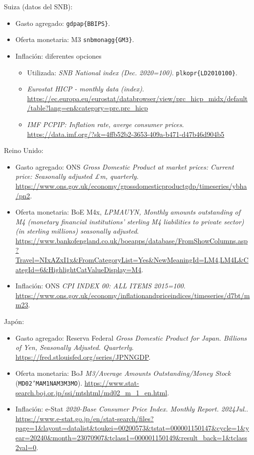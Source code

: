 Suiza (datos del SNB):
\begin{itemize}
  \item Gasto agregado: \texttt{gdpap\{BBIPS\}}.
  \item Oferta monetaria: M3 \texttt{snbmonagg\{GM3\}}.
  \item Inflación: diferentes opciones
        \begin{itemize}
          \item Utilizada: \textit{SNB National index (Dec. 2020=100)}. \texttt{plkopr\{LD2010100\}}.
          \item \textit{Eurostat HICP - monthly data (index)}. \url{https://ec.europa.eu/eurostat/databrowser/view/prc_hicp_midx/default/table?lang=en&category=prc.prc_hicp}
          \item \textit{IMF PCPIP: Inflation rate, averge consumer prices}. \url{https://data.imf.org/?sk=4ffb52b2-3653-409a-b471-d47b46d904b5}
        \end{itemize}
\end{itemize}

Reino Unido:
\begin{itemize}
  \item Gasto agregado: ONS \textit{Gross Domestic Product at market prices: Current price: Seasonally adjusted £m, quarterly}. \url{https://www.ons.gov.uk/economy/grossdomesticproductgdp/timeseries/ybha/pn2}.
  \item Oferta monetaria: BoE M4x, \textit{LPMAUYN, Monthly amounts outstanding of M4 (monetary financial institutions' sterling M4 liabilities to private sector) (in sterling millions) seasonally adjusted}. \url{https://www.bankofengland.co.uk/boeapps/database/FromShowColumns.asp?Travel=NIxAZxI1x&FromCategoryList=Yes&NewMeaningId=LM4,LM4L&CategId=6&HighlightCatValueDisplay=M4}.
  \item Inflación: ONS \textit{CPI INDEX 00: ALL ITEMS 2015=100}. \url{https://www.ons.gov.uk/economy/inflationandpriceindices/timeseries/d7bt/mm23}.
\end{itemize}

Japón:
\begin{itemize}
  \item Gasto agregado: Reserva Federal \textit{Gross Domestic Product for Japan. Billions of Yen,
          Seasonally Adjusted. Quarterly}. \url{https://fred.stlouisfed.org/series/JPNNGDP}.
  \item Oferta monetaria: BoJ \textit{M3/Average Amounts Outstanding/Money Stock} (\texttt{MD02'MAM1NAM3M3MO}). \url{https://www.stat-search.boj.or.jp/ssi/mtshtml/md02_m_1_en.html}.
  \item Inflación: e-Stat \textit{2020-Base Consumer Price Index. Monthly Report. 2024Jul.}. \url{https://www.e-stat.go.jp/en/stat-search/files?page=1&layout=datalist&toukei=00200573&tstat=000001150147&cycle=1&year=20240&month=23070907&tclass1=000001150149&result_back=1&tclass2val=0}.

\end{itemize}